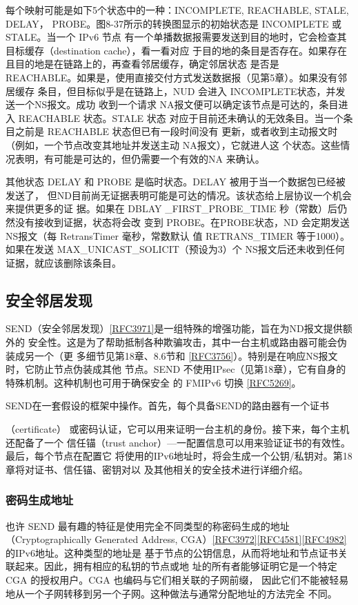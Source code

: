每个映射可能是如下5个状态中的一种：INCOMPLETE, REACHABLE, STALE, DELAY，
PROBE。图8-37所示的转换图显示的初始状态是 INCOMPLETE 或 STALE。当一个 IPv6 节点
有一个单播数据报需要发送到目的地时，它会检查其目标缓存（destination cache），看一看对应
于目的地的条目是否存在。如果存在且目的地是在链路上的，再查看邻居缓存，确定邻居状态
是否是 REACHABLE。如果是，使用直接交付方式发送数据报（见第5章）。如果没有邻居缓存
条目，但目标似乎是在链路上，NUD 会进入 INCOMPLETE状态，并发送一个NS报文。成功
收到一个请求 NA报文便可以确定该节点是可达的，条目进入 REACHABLE 状态。STALE 状态
对应于目前还未确认的无效条目。当一个条目之前是 REACHABLE 状态但已有一段时间没有
更新，或者收到主动报文时（例如，一个节点改变其地址并发送主动 NA报文），它就进人这
个状态。这些情况表明，有可能是可达的，但仍需要一个有效的NA 来确认。

其他状态 DELAY 和 PROBE 是临时状态。DELAY 被用于当一个数据包已经被发送了，
但ND目前尚无证据表明可能是可达的情况。该状态给上层协议一个机会来提供更多的证
据。如果在 DBLAY \_FIRST\_PROBE\_TIME 秒（常数）后仍然没有接收到证据，状态将会改
变到 PROBE。在PROBE状态，ND 会定期发送NS报文（每 RetransTimer 毫秒，常数默认
值 RETRANS\_TIMER 等于1000）。如果在发送 MAX\_UNICAST\_SOLICIT（预设为3）个
NS报文后还未收到任何证据，就应该删除该条目。

\subsection{安全邻居发现}
SEND（安全邻居发现）\href{https://www.rfc-editor.org/rfc/rfc3971}{[RFC3971]}是一组特殊的增强功能，旨在为ND报文提供额外的
安全性。这是为了帮助抵制各种欺骗攻击，其中一台主机或路由器可能会伪装成另一个（更
多细节见第18章、8.6节和 \href{https://www.rfc-editor.org/rfc/rfc3756}{[RFC3756]}）。特别是在响应NS报文时，它防止节点伪装成其他
节点。SEND 不使用IPsec（见第18章），它有自身的特殊机制。这种机制也可用于确保安全
的 FMIPv6 切换 \href{https://www.rfc-editor.org/rfc/rfc5269}{[RFC5269]}。

SEND在一套假设的框架中操作。首先，每个具备SEND的路由器有一个证书

（certificate） 或密码认证，它可以用来证明一台主机的身份。接下来，每个主机还配备了一个
信任锚（trust anchor）—一配置信息可以用来验证证书的有效性。最后，每个节点在配置它
将使用的IPv6地址时，将会生成一个公钥/私钥对。第18章将对证书、信任锚、密钥对以
及其他相关的安全技术进行详细介绍。

\subsubsection{密码生成地址}
也许 SEND 最有趣的特征是使用完全不同类型的称密码生成的地址（Cryptographically
Generated Address, CGA）\href{https://www.rfc-editor.org/rfc/rfc3972}{[RFC3972]}\href{https://www.rfc-editor.org/rfc/rfc4581}{[RFC4581]}\href{https://www.rfc-editor.org/rfc/rfc4982}{[RFC4982]} 的IPv6地址。这种类型的地址是
基于节点的公钥信息，从而将地址和节点证书关联起来。因此，拥有相应的私钥的节点或地
址的所有者能够证明它是一个特定CGA 的授权用户。CGA 也编码与它们相关联的子网前缀，
因此它们不能被轻易地从一个子网转移到另一个子网。这种做法与通常分配地址的方法完全
不同。

